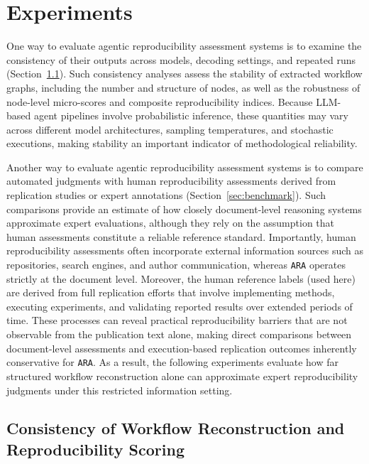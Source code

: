 \documentclass{article}
\begin{document}
\section{Experiments}

One way to evaluate agentic reproducibility assessment systems is to examine the consistency of their outputs across models, decoding settings, and repeated runs (Section~\ref{sec:consistency-analysis}).
Such consistency analyses assess the stability of extracted workflow graphs, including the number and structure of nodes, as well as the robustness of node-level micro-scores and composite reproducibility indices.
Because LLM-based agent pipelines involve probabilistic inference, these quantities may vary across different model architectures, sampling temperatures, and stochastic executions, making stability an important indicator of methodological reliability.

Another way to evaluate agentic reproducibility assessment systems is to compare automated judgments with human reproducibility assessments derived from replication studies or expert annotations (Section~\ref{sec:benchmark}).
Such comparisons provide an estimate of how closely document-level reasoning systems approximate expert evaluations, although they rely on the assumption that human assessments constitute a reliable reference standard.
Importantly, human reproducibility assessments often incorporate external information sources such as repositories, search engines, and author communication, whereas \texttt{ARA} operates strictly at the document level.
Moreover, the human reference labels (used here) are derived from full replication efforts that involve implementing methods, executing experiments, and validating reported results over extended periods of time.
These processes can reveal practical reproducibility barriers that are not observable from the publication text alone, making direct comparisons between document-level assessments and execution-based replication outcomes inherently conservative for \texttt{ARA}.
As a result, the following experiments evaluate how far structured workflow reconstruction alone can approximate expert reproducibility judgments under this restricted information setting.


\subsection{Consistency of Workflow Reconstruction and Reproducibility Scoring} \label{sec:consistency-analysis}
\end{document}
